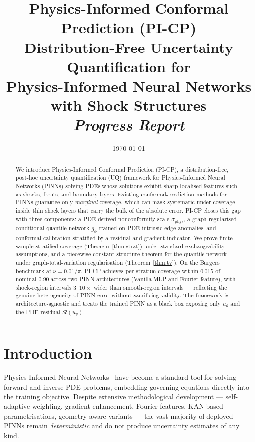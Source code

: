 \documentclass[11pt]{article}
\title{
\textbf{Physics-Informed Conformal Prediction (PI-CP)}\\[0.4em]
\large Distribution-Free Uncertainty Quantification for\\
Physics-Informed Neural Networks with Shock Structures\\[0.6em]
\normalsize\textit{Progress Report}
}
\date{\today}
\theoremstyle{definition}
\theoremstyle{remark}
\newcommand{\sphys}{\sigma_{\mathrm{phys}}}
\newcommand{\Rop}{\mathcal{R}}
\begin{document}
\maketitle

\begin{abstract}
\noindent
We introduce Physics-Informed Conformal Prediction (PI-CP), a distribution-free, post-hoc uncertainty quantification (UQ) framework for Physics-Informed Neural Networks (PINNs) solving PDEs whose solutions exhibit sharp localised features such as shocks, fronts, and boundary layers. Existing conformal-prediction methods for PINNs guarantee only \emph{marginal} coverage, which can mask systematic under-coverage inside thin shock layers that carry the bulk of the absolute error. PI-CP closes this gap with three components: a PDE-derived nonconformity scale $\sphys$, a graph-regularised conditional-quantile network $g_\phi$ trained on PDE-intrinsic edge anomalies, and conformal calibration stratified by a residual-and-gradient indicator. We prove finite-sample stratified coverage (Theorem~\ref{thm:strat}) under standard exchangeability assumptions, and a piecewise-constant structure theorem for the quantile network under graph-total-variation regularisation (Theorem~\ref{thm:tv}). On the Burgers benchmark at $\nu = 0.01/\pi$, PI-CP achieves per-stratum coverage within $0.015$ of nominal $0.90$ across two PINN architectures (Vanilla MLP and Fourier-feature), with shock-region intervals $3$--$10\times$ wider than smooth-region intervals --- reflecting the genuine heterogeneity of PINN error without sacrificing validity. The framework is architecture-agnostic and treats the trained PINN as a black box exposing only $u_\theta$ and the PDE residual $\Rop(u_\theta)$.
\end{abstract}

\tableofcontents
\newpage

\section{Introduction}
\label{sec:intro}

Physics-Informed Neural Networks~\cite{raissi2019pinns,karniadakis2021review} have become a standard tool for solving forward and inverse PDE problems, embedding governing equations directly into the training objective. Despite extensive methodological development --- self-adaptive weighting, gradient enhancement, Fourier features, KAN-based parametrisations, geometry-aware variants --- the vast majority of deployed PINNs remain \emph{deterministic} and do not produce uncertainty estimates of any kind.
\end{document}
